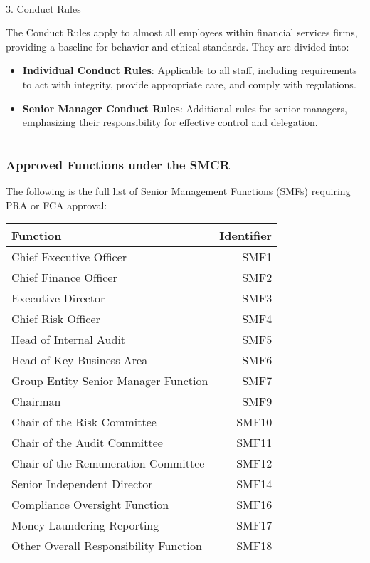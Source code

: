 \documentclass[
  a4paper,
]{article}
\makeatletter
\let\oldparagraph\paragraph
\renewcommand{\paragraph}{
    \@ifstar
      \xxxParagraphStar
      \xxxParagraphNoStar
  }
\newcommand{\xxxParagraphStar}[1]{\oldparagraph*{#1}\mbox{}}
\newcommand{\xxxParagraphNoStar}[1]{\oldparagraph{#1}\mbox{}}
\providecommand{\tightlist}{%
  \setlength{\itemsep}{0pt}\setlength{\parskip}{0pt}}\usepackage{longtable,booktabs,array}
\makeatother
\begin{document}
\paragraph{3. Conduct Rules}\label{conduct-rules}

The Conduct Rules apply to almost all employees within financial
services firms, providing a baseline for behavior and ethical standards.
They are divided into:

\begin{itemize}
\tightlist
\item
  \textbf{Individual Conduct Rules}: Applicable to all staff, including
  requirements to act with integrity, provide appropriate care, and
  comply with regulations.
\item
  \textbf{Senior Manager Conduct Rules}: Additional rules for senior
  managers, emphasizing their responsibility for effective control and
  delegation.
\end{itemize}

\begin{center}\rule{0.5\linewidth}{0.5pt}\end{center}

\subsubsection{Approved Functions under the
SMCR}\label{approved-functions-under-the-smcr}

The following is the full list of Senior Management Functions (SMFs)
requiring PRA or FCA approval:

\begin{longtable}[]{@{}lr@{}}
\toprule\noalign{}
Function & Identifier \\
\midrule\noalign{}
\endhead
\bottomrule\noalign{}
\endlastfoot
Chief Executive Officer & SMF1 \\
Chief Finance Officer & SMF2 \\
Executive Director & SMF3 \\
Chief Risk Officer & SMF4 \\
Head of Internal Audit & SMF5 \\
Head of Key Business Area & SMF6 \\
Group Entity Senior Manager Function & SMF7 \\
Chairman & SMF9 \\
Chair of the Risk Committee & SMF10 \\
Chair of the Audit Committee & SMF11 \\
Chair of the Remuneration Committee & SMF12 \\
Senior Independent Director & SMF14 \\
Compliance Oversight Function & SMF16 \\
Money Laundering Reporting & SMF17 \\
Other Overall Responsibility Function & SMF18 \\
\end{longtable}
\end{document}
